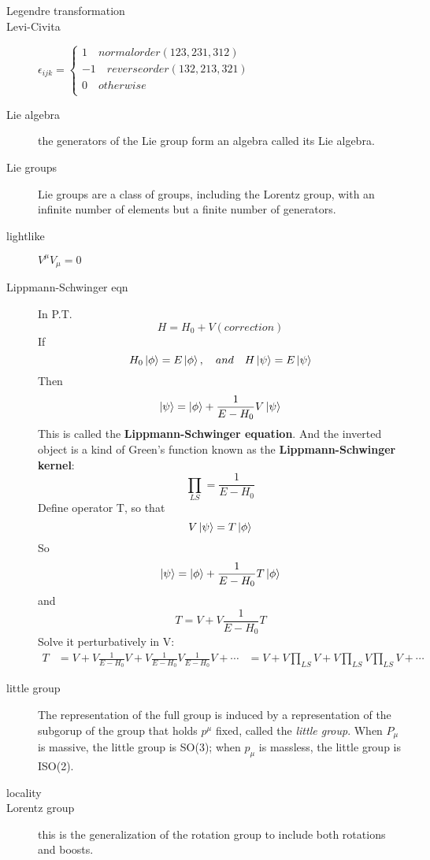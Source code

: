 \begin{description}
    \item [Legendre transformation]
    \item [Levi-Civita] $\epsilon_{ijk} = \left\{
	\begin{aligned}
	    1\quad  normal order(123,231,312) \\
	    -1\quad reverse order(132,213,321)	\\
	    0\quad  otherwise	\\
	\end{aligned} \right.$
    \item [Lie algebra] the generators of the Lie group form an algebra
	called its Lie algebra. 
    \item [Lie groups]	Lie groups are a class of groups, including the
	Lorentz group, with an infinite number of elements but a finite
	number of generators.
    \item [lightlike]	$V^\mu V_\mu = 0$
    \item [Lippmann-Schwinger eqn] 
	In P.T.
	\[
	    H = H_0 + V (correction)
	    \]
	If 
	\[
	    H_0\ket{\phi} = E\ket{\phi}, \quad and \quad 
	    H\ket{\psi} = E\ket{\psi}
	    \]
	Then
	\[
	    \ket{\psi} = \ket{\phi} + \frac{1}{E-H_0}V\ket{\psi}
	    \]
	This is called the \textbf{Lippmann-Schwinger equation}. And the inverted object 
	is a kind of Green's function known as the \textbf{Lippmann-Schwinger kernel}:
	\[
	    \prod_{LS} = \frac{1}{E-H_0}
	    \]
	Define operator T, so that
	\[
	    V\ket{\psi} = T\ket{\phi}
	    \]
	So
	\[
	    \ket{\psi} = \ket{\phi} + \frac{1}{E-H_0}T\ket{\phi}
	    \]
	and 
	\[
	    T = V + V\frac{1}{E-H_0}T
	    \]
	Solve it perturbatively in V:
	\[
	    \begin{aligned}
		T &= V + V\frac{1}{E-H_0}V + V\frac{1}{E-H_0}V\frac{1}{E-H_0}V + \cdots
		  &= V + V\prod_{LS}V + V\prod_{LS}V\prod_{LS}V + \cdots
	    \end{aligned}
	    \]

    \item [little group] The representation of the full \Poincare{}
	group is induced by a representation of the subgorup of the
	\Poincare{} group that holds $p^\mu$ fixed, called the
	\emph{little group}. When $P_\mu$ is massive, the little group is
	SO(3); when $p_\mu$ is massless, the little group is ISO(2).
    \item [locality]
    \item [Lorentz group] this is the generalization of the rotation group
	to include both rotations and boosts.


\end{description}
